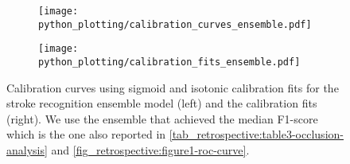 \begin{figure}
    \begin{subfigure}[c]{0.48\columnwidth}
        \centering
        \texttt{[image: python\_plotting/calibration\_curves\_ensemble.pdf]}
    \end{subfigure}
    \begin{subfigure}[c]{0.48\columnwidth}
        \centering
        \texttt{[image: python\_plotting/calibration\_fits\_ensemble.pdf]}
    \end{subfigure}
    \caption[Calibration fits and curves for the stroke recognition model using Platt-scaling and isotonic regression for calibration.]{ Calibration curves using sigmoid and isotonic calibration fits for the stroke recognition ensemble model (left) and the calibration fits (right). We use the ensemble that achieved the median F1-score which is the one also reported in \cref{tab_retrospective:table3-occlusion-analysis} and \cref{fig_retrospective:figure1-roc-curve}.}
    \label{fig_discussion:retrospective-paper-calibration-curve-sigmoid-isotonic}
\end{figure}



